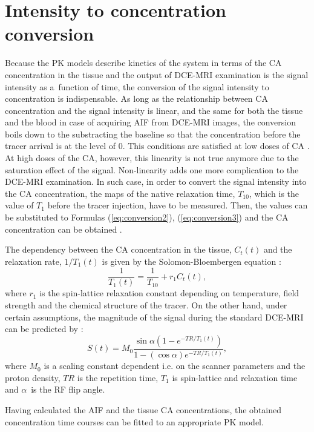 \section{Intensity to concentration conversion}
Because the PK models describe kinetics of the system in terms of the CA concentration in the tissue and the output of DCE-MRI examination is the signal intensity as a~function of time, the conversion of the signal intensity to concentration is indispensable. 
As long as the relationship between CA concentration and the signal intensity  is linear, and the same for both the tissue and the blood in case of acquiring AIF from DCE-MRI images, the conversion boils down to the substracting the baseline so that the concentration before the tracer arrival is at the level of 0. 
\newpage
\noindent This conditions are satisfied at low doses of CA \cite{khalifa2014models}.
At high doses of the CA, however, this linearity is not true anymore due to the saturation effect of the signal. Non-linearity adds one more complication to the DCE-MRI examination. In such case, in order to convert the signal intensity into the CA concentration, the maps of the native relaxation time, $T_{10}$, which is the value of $T_1$ before the tracer injection, have to be measured. Then, the values can be substituted to Formulas (\ref{eq:conversion2}), (\ref{eq:conversion3}) and the CA concentration can be obtained \cite{khalifa2014models, jackson2005dynamic, barnes2012practical}.


The dependency between the CA concentration in the tissue, $C_t(t)$  and the relaxation rate, $1/T_1(t)$ is given by the Solomon-Bloembergen equation \cite{jackson2005dynamic}:
 \begin{equation}
 \frac{1}{T_1(t)} = \frac{1}{T_{10}}+r_1C_t(t),
 \label{eq:conversion2}
 \end{equation}
where $r_1$ is the spin-lattice relaxation constant depending on temperature, field strength and the chemical structure of the tracer. On the other hand, under certain assumptions, the magnitude of the signal during the standard DCE-MRI can be predicted by \cite{khalifa2014models, jackson2005dynamic}:
  \begin{equation}
 S(t)  = M_0\frac{\sin\alpha(1-e^{-TR/T_1(t)})}      {1-(\cos\alpha)e^{-TR/T_1(t)}},
 \label{eq:conversion3}
 \end{equation} 
where $M_0$ is a scaling constant dependent i.e. on the scanner parameters and the proton density, $TR$ is the repetition time, $T_1$ is spin-lattice and relaxation time and $\alpha$~is the RF flip angle.

Having calculated the AIF and the tissue CA concentrations, the obtained concentration time courses can be fitted to an appropriate PK model. 
